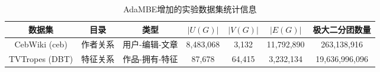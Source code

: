 \begin{table} [t]
	\centering    
	\setlength{\abovecaptionskip}{0cm}  
  \setlength{\belowcaptionskip}{-0.1cm}
	\caption{AdaMBE增加的实验数据集统计信息}      
	\label{tbl:ada_datasets}
	\setlength{\tabcolsep}{3pt}
	\begin{center}
				\small{
		\begin{tabular}{ccccccc}
			\hline 
			\textbf{数据集} &\textbf{目录} &\textbf{类型} & \textbf{$|U(G)|$} & \textbf{$|V(G)|$} & \textbf{$|E(G)|$} &\textbf{极大二分团数量}\\
			\hline
      CebWiki (ceb) & 作者关系 & 用户-编辑-文章 & 8,483,068 & 3,132 & 11,792,890 & 263,138,916\\
			TVTropes (DBT) & 特征关系 & 作品-拥有-特征 & 87,678 & 64,415 & 3,232,134 & 19,636,996,096 \\ 

\end{tabular}}
\end{center}
\end{table}
